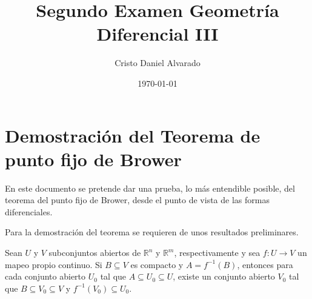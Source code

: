 \documentclass[12pt]{report}
\theoremstyle{largebreak}
\newcommand\cf[3]{\ensuremath{#1:#2\rightarrow#3}}
\begin{document}
    \title{Segundo Examen Geometría Diferencial III}
    \author{Cristo Daniel Alvarado}
    \date{\today}
    \maketitle

    \setcounter{chapter}{3} %
    \setcounter{section}{5}
    \section{Demostración del Teorema de punto fijo de Brower}
    
En este documento se pretende dar una prueba, lo más entendible posible, del teorema del punto fijo de Brower, desde el punto de vista de las formas diferenciales. 

Para la demostración del teorema se requieren de unos resultados preliminares.

\setcounter{section}{4}
\setcounter{theor}{6}

\begin{theor}
    Sean $U$ y $V$ subconjuntos abiertos de $\mathbb{R}^n$ y $\mathbb{R}^m$, respectivamente y sea $\cf{f}{U}{V}$ un mapeo propio continuo. Si $B\subseteq V$ es compacto y $A=f^{-1}(B)$, entonces para cada conjunto abierto $U_0$ tal que $A\subseteq U_0\subseteq U$, existe un conjunto abierto $V_0$ tal que $B\subseteq V_0\subseteq V$ y $f^{-1}(V_0)\subseteq U_0$.
\end{theor}
\end{document}
